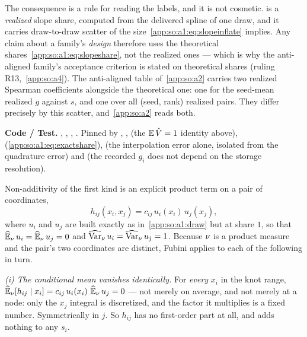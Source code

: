 The consequence is a rule for reading the labels, and it is not cosmetic.
 is a \emph{realized} slope share, computed from the
delivered spline of one draw, and it carries draw-to-draw scatter of the
size~\eqref{app:so:a1:eq:slopeinflate} implies. Any claim about a family's
\emph{design} therefore uses the theoretical
shares~\eqref{app:so:a1:eq:slopeshare}, not the realized ones --- which is why
the anti-aligned family's acceptance criterion is stated on theoretical shares
(ruling R13,~\ref{app:so:a4}). The anti-aligned table of~\ref{app:so:a2}
carries two realized Spearman coefficients alongside the theoretical one: one
for the seed-mean realized $g$ against $s$, and one over all (seed, rank)
realized pairs. They differ precisely by this scatter, and~\ref{app:so:a2}
reads both.

\begin{sloppypar}
\textbf{Code / Test.} , ,
, . Pinned by
,
,
(the $\Ex{}\hat V=1$ identity above),
(\eqref{app:so:a1:eq:exactshare}),  (the
interpolation error alone, isolated from the quadrature error) and
 (the recorded
$g_i$ does not depend on the storage resolution).
\end{sloppypar}

\label{app:so:a1:interaction}

Non-additivity of the first kind is an explicit product term on a pair of
coordinates,
\begin{equation}\label{app:so:a1:eq:hdef}
  h_{ij}(x_i,x_j)=c_{ij}\,u_i(x_i)\,u_j(x_j),
\end{equation}
where $u_i$ and $u_j$ are built exactly as in~\ref{app:so:a1:draw} but at
share $1$, so that $\operatorname{\widehat{\mathbb{E}}}_\nu u_i=\operatorname{\widehat{\mathbb{E}}}_\nu u_j=0$ and $\operatorname{\widehat{\mathrm{Var}}}_\nu u_i=\operatorname{\widehat{\mathrm{Var}}}_\nu u_j=1$.
Because $\nu$ is a product measure and the pair's two coordinates are
distinct, Fubini applies to each of the following in turn.

\emph{(i) The conditional mean vanishes identically.} For \emph{every} $x_i$
in the knot range, $\operatorname{\widehat{\mathbb{E}}}_\nu[h_{ij}\mid x_i]=c_{ij}\,u_i(x_i)\,\operatorname{\widehat{\mathbb{E}}}_\nu u_j=0$ ---
not merely on average, and not merely at a node: only the $x_j$ integral is
discretized, and the factor it multiplies is a fixed number. Symmetrically in
$j$. So $h_{ij}$ has no first-order part at all, and adds nothing to any
$s_i$.

